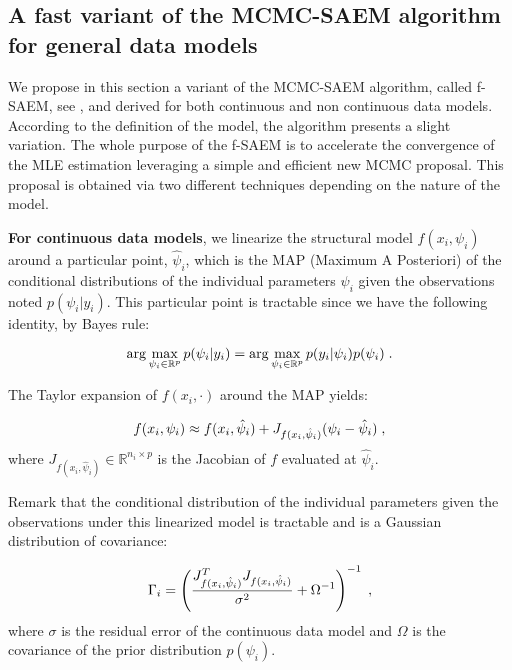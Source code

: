 \subsection{A fast variant of the MCMC-SAEM algorithm for general data models}\label{subsec:fsaem}

We propose in this section a variant of the MCMC-SAEM algorithm, called f-SAEM, see \cite{Karimi19}, and derived for both continuous and non continuous data models.
According to the definition of the model, the algorithm presents a slight variation.
The whole purpose of the f-SAEM is to accelerate the convergence of the MLE estimation leveraging a simple and efficient new MCMC proposal.
This proposal is obtained via two different techniques depending on the nature of the model.

\textbf{For continuous data models}, we linearize the structural model $f(x_{i}, \psi_i)$ around a particular point, $\hat{\psi}_i$, which is the MAP (Maximum A Posteriori) of the conditional distributions of the individual parameters $\psi_i$ given the observations noted $p(\psi_i|y_i) $. This particular point is tractable since we have the following identity, by Bayes rule:

\begin{equation}
\arg \max \limits_{\psi_i \in \mathbb{R}^p} p(\psi_i|y_i) = \arg \max \limits_{\psi_i \in \mathbb{R}^p} p(y_i|\psi_i)p(\psi_i) \;.
\end{equation}

The Taylor expansion of $f(x_{i},\cdot)$ around the MAP yields:

\begin{equation}
f(x_{i},\psi_i) \approx f(x_{i},\hat{\psi}_i) + J_{f(x_{i},\hat{\psi}_i)}(\psi_i - \hat{\psi}_i)\;,
\end{equation}
where $J_{f(x_{i},\hat{\psi}_i)} \in \mathbb{R}^{n_i \times p}$ is the Jacobian of $f$ evaluated at $\hat{\psi}_i$. 

Remark that the conditional distribution of the individual parameters given the observations under this linearized model is tractable and is a Gaussian distribution of covariance:


\begin{equation}
\Gamma_i =\left(\frac{ J_{f(x_{i},\hat{\psi}_i)}^T J_{f(x_{i},\hat{\psi}_i)} }{\sigma^2} + \Omega^{-1}\right)^{-1} \;,
\end{equation}
where $\sigma$ is the residual error of the continuous data model and $\Omega$ is the covariance of the prior distribution $p(\psi_i)$.

